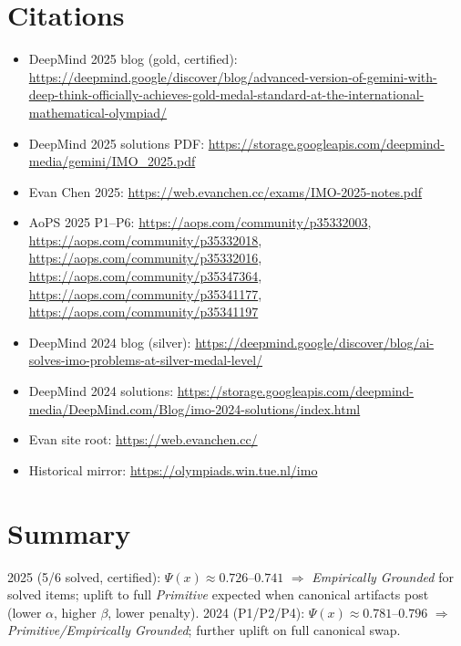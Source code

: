 \documentclass[11pt]{article}
\newcommand{\Px}{\Psi(x)}
\begin{document}
\section{Citations}
\begin{itemize}[leftmargin=1.35em]
  \item DeepMind 2025 blog (gold, certified): \url{https://deepmind.google/discover/blog/advanced-version-of-gemini-with-deep-think-officially-achieves-gold-medal-standard-at-the-international-mathematical-olympiad/}
  \item DeepMind 2025 solutions PDF: \url{https://storage.googleapis.com/deepmind-media/gemini/IMO_2025.pdf}
  \item Evan Chen 2025: \url{https://web.evanchen.cc/exams/IMO-2025-notes.pdf}
  \item AoPS 2025 P1--P6: \url{https://aops.com/community/p35332003}, \url{https://aops.com/community/p35332018}, \url{https://aops.com/community/p35332016}, \url{https://aops.com/community/p35347364}, \url{https://aops.com/community/p35341177}, \url{https://aops.com/community/p35341197}
  \item DeepMind 2024 blog (silver): \url{https://deepmind.google/discover/blog/ai-solves-imo-problems-at-silver-medal-level/}
  \item DeepMind 2024 solutions: \url{https://storage.googleapis.com/deepmind-media/DeepMind.com/Blog/imo-2024-solutions/index.html}
  \item Evan site root: \url{https://web.evanchen.cc/}
  \item Historical mirror: \url{https://olympiads.win.tue.nl/imo}
\end{itemize}

\section*{Summary}
2025 (5/6 solved, certified): $\Px\approx 0.726$--$0.741$ $\Rightarrow$ \emph{Empirically Grounded} for solved items; uplift to full \emph{Primitive} expected when canonical artifacts post (lower $\alpha$, higher $\beta$, lower penalty).
2024 (P1/P2/P4): $\Px\approx 0.781$--$0.796$ $\Rightarrow$ \emph{Primitive/Empirically Grounded}; further uplift on full canonical swap.
\end{document}
